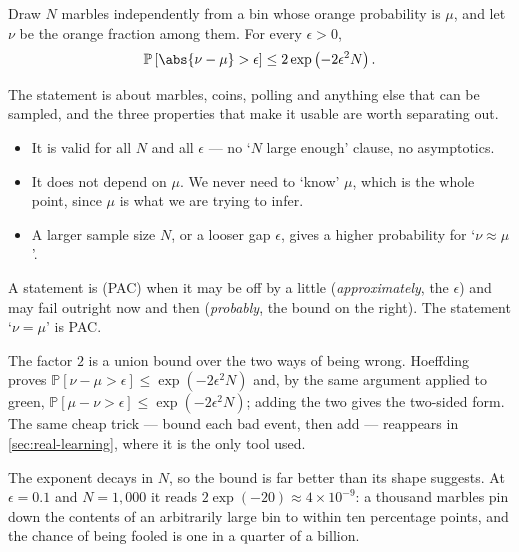 \begin{theorem}\label{thm:hoeffding}
    Draw \(N\) marbles independently from a bin whose orange probability is
    \(\mu\), and let \(\nu\) be the orange fraction among them. For every
    \(\epsilon > 0\),
    \[
        \mathbb{P}\left[ \abs{\nu - \mu} > \epsilon \right]
        \le 2 \exp \left( -2 \epsilon^2 N \right) .
    \]
\end{theorem}

The statement is about marbles, coins, polling and anything else that can be
sampled, and the three properties that make it usable are worth separating out.

\begin{itemize}
    \item It is valid for all \(N\) and all \(\epsilon\) --- no `\(N\) large
        enough' clause, no asymptotics.
    \item It does not depend on \(\mu\). We never need to `know' \(\mu\), which
        is the whole point, since \(\mu\) is what we are trying to infer.
    \item A larger sample size \(N\), or a looser gap \(\epsilon\), gives a
        higher probability for `\(\nu \approx \mu\)'.
\end{itemize}

\begin{definition}[PAC]
    A statement is  (PAC) when it may be
    off by a little (\emph{approximately}, the \(\epsilon\)) and may fail
    outright now and then (\emph{probably}, the bound on the right). The
    statement `\(\nu = \mu\)' is PAC.
\end{definition}

\begin{remark}
    The factor \(2\) is a union bound over the two ways of being wrong. Hoeffding
    proves \(\mathbb{P}\left[ \nu - \mu > \epsilon \right] \le
    \exp(-2\epsilon^2 N)\) and, by the same argument applied to green,
    \(\mathbb{P}\left[ \mu - \nu > \epsilon \right] \le \exp(-2\epsilon^2 N)\);
    adding the two gives the two-sided form. The same cheap trick --- bound each
    bad event, then add --- reappears in \autoref{sec:real-learning}, where it
    is the only tool used.
\end{remark}

\begin{note}
    The exponent decays in \(N\), so the bound is far better than its shape
    suggests. At \(\epsilon = 0.1\) and \(N = 1{,}000\) it reads
    \(2\exp(-20) \approx 4 \times 10^{-9}\): a thousand marbles pin down the
    contents of an arbitrarily large bin to within ten percentage points, and
    the chance of being fooled is one in a quarter of a billion.
\end{note}

